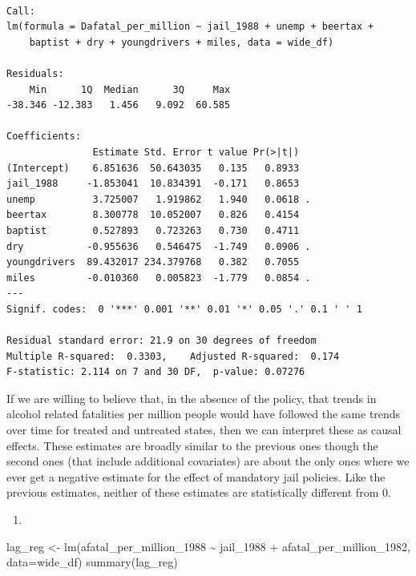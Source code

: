 \documentclass[
  letterpaper,
  DIV=11,
  numbers=noendperiod]{scrreprt}
\newenvironment{Shaded}{\begin{snugshade}}{\end{snugshade}}
\newcommand{\AttributeTok}[1]{\textcolor[rgb]{0.40,0.45,0.13}{#1}}
\newcommand{\FunctionTok}[1]{\textcolor[rgb]{0.28,0.35,0.67}{#1}}
\newcommand{\NormalTok}[1]{\textcolor[rgb]{0.00,0.23,0.31}{#1}}
\newcommand{\OtherTok}[1]{\textcolor[rgb]{0.00,0.23,0.31}{#1}}
\newcommand{\SpecialCharTok}[1]{\textcolor[rgb]{0.37,0.37,0.37}{#1}}
\providecommand{\tightlist}{%
  \setlength{\itemsep}{0pt}\setlength{\parskip}{0pt}}\usepackage{longtable,booktabs,array}
\begin{document}
\begin{verbatim}

Call:
lm(formula = Dafatal_per_million ~ jail_1988 + unemp + beertax + 
    baptist + dry + youngdrivers + miles, data = wide_df)

Residuals:
    Min      1Q  Median      3Q     Max 
-38.346 -12.383   1.456   9.092  60.585 

Coefficients:
               Estimate Std. Error t value Pr(>|t|)  
(Intercept)    6.851636  50.643035   0.135   0.8933  
jail_1988     -1.853041  10.834391  -0.171   0.8653  
unemp          3.725007   1.919862   1.940   0.0618 .
beertax        8.300778  10.052007   0.826   0.4154  
baptist        0.527893   0.723263   0.730   0.4711  
dry           -0.955636   0.546475  -1.749   0.0906 .
youngdrivers  89.432017 234.379768   0.382   0.7055  
miles         -0.010360   0.005823  -1.779   0.0854 .
---
Signif. codes:  0 '***' 0.001 '**' 0.01 '*' 0.05 '.' 0.1 ' ' 1

Residual standard error: 21.9 on 30 degrees of freedom
Multiple R-squared:  0.3303,    Adjusted R-squared:  0.174 
F-statistic: 2.114 on 7 and 30 DF,  p-value: 0.07276
\end{verbatim}

If we are willing to believe that, in the absence of the policy, that
trends in alcohol related fatalities per million people would have
followed the same trends over time for treated and untreated states,
then we can interpret these as causal effects. These estimates are
broadly similar to the previous ones though the second ones (that
include additional covariates) are about the only ones where we ever get
a negative estimate for the effect of mandatory jail policies. Like the
previous estimates, neither of these estimates are statistically
different from 0.

\begin{enumerate}
\def\labelenumi{\arabic{enumi}.}
\setcounter{enumi}{8}
\tightlist
\item
\end{enumerate}

\begin{Shaded}
\begin{Highlighting}[]
\NormalTok{lag\_reg }\OtherTok{\textless{}{-}} \FunctionTok{lm}\NormalTok{(afatal\_per\_million\_1988 }\SpecialCharTok{\textasciitilde{}}\NormalTok{ jail\_1988 }\SpecialCharTok{+}\NormalTok{ afatal\_per\_million\_1982, }\AttributeTok{data=}\NormalTok{wide\_df)}
\FunctionTok{summary}\NormalTok{(lag\_reg)}
\end{Highlighting}
\end{Shaded}
\end{document}
